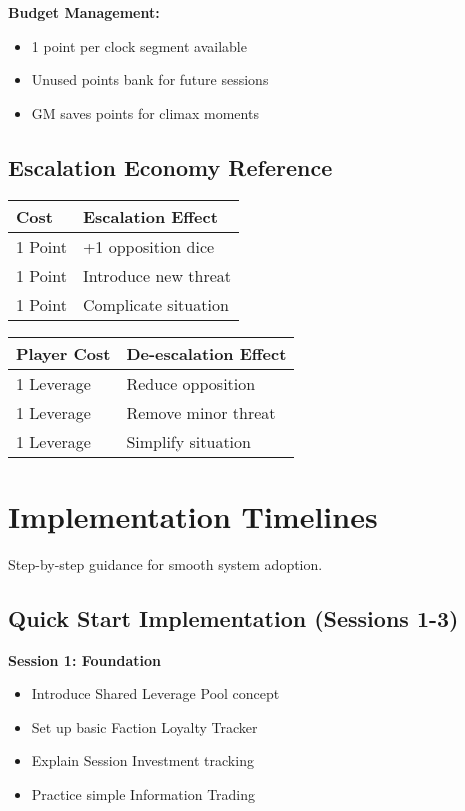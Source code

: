 \textbf{Budget Management:}
\begin{itemize}
\item 1 point per clock segment available
\item Unused points bank for future sessions
\item GM saves points for climax moments
\end{itemize}

\subsection{Escalation Economy Reference}
\begin{center}
\begin{tabular}{|l|l|}
\hline
\textbf{Cost} & \textbf{Escalation Effect} \\
\hline
1 Point & +1 opposition dice \\
1 Point & Introduce new threat \\
1 Point & Complicate situation \\
\hline
\end{tabular}
\end{center}

\begin{center}
\begin{tabular}{|l|l|}
\hline
\textbf{Player Cost} & \textbf{De-escalation Effect} \\
\hline
1 Leverage & Reduce opposition \\
1 Leverage & Remove minor threat \\
1 Leverage & Simplify situation \\
\hline
\end{tabular}
\end{center}

\section{Implementation Timelines}

Step-by-step guidance for smooth system adoption.

\subsection{Quick Start Implementation (Sessions 1-3)}

\textbf{Session 1: Foundation}
\begin{itemize}
\item Introduce Shared Leverage Pool concept
\item Set up basic Faction Loyalty Tracker
\item Explain Session Investment tracking
\item Practice simple Information Trading
\end{itemize}

